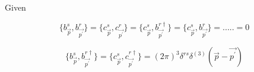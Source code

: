 \documentclass[12pt, letterpaper]{article}
\newcommand*{\1}{\hspace{1pt}}
\begin{document}
Given 

\begin{equation}
    \big\{b^{s} _{\overrightarrow{p}}, b^{r} _{\overrightarrow {p ^{\prime}}}\big\} = \big\{c^{s} _{\overrightarrow{p}}, c^{r } _{\overrightarrow {p ^{\prime}}}\big\} = \big\{c^{s} _{\overrightarrow{p}}, b^{r \dagger} _{\overrightarrow {p ^{\prime}}}\big\} = \big\{c^{s} _{\overrightarrow{p}}, b^{r} _{\overrightarrow {p ^{\prime}}}\big\} = ..... = 0
\end{equation}

\begin{equation}
    \big\{b^{s} _{\overrightarrow{p}}, b^{r \dagger} _{\overrightarrow {p ^{\prime}}}\big\} = \big\{c^{s} _{\overrightarrow{p}}, c^{r \dagger} _{\overrightarrow {p ^{\prime}}}\big\} = (2 \pi) ^{3} \delta ^{rs} \delta ^{(3)}(\overrightarrow{p} - \overrightarrow{p ^{\prime}}) 
\end{equation}
\end{document}
